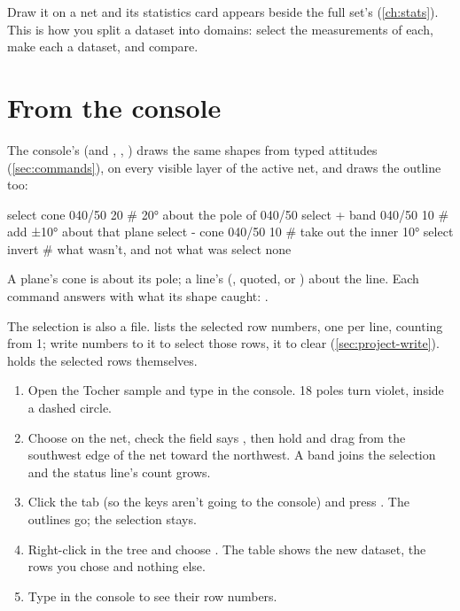 Draw it on a net and its statistics card appears beside the full set's (\cref{ch:stats}). This is how you
split a dataset into domains: select the measurements of each, make each a dataset, and compare.

\section{From the console}\label{sec:select-console}

The console's  (and , ,
) draws the same shapes from typed attitudes (\cref{sec:commands}), on every
visible layer of the active net, and draws the outline too:

\begin{codeblock}
select cone 040/50 20     # 20° about the pole of 040/50
select + band 040/50 10   # add ±10° about that plane
select - cone 040/50 10   # take out the inner 10°
select invert             # what wasn't, and not what was
select none
\end{codeblock}

A plane's cone is about its pole; a line's (, quoted, or ) about the line.
Each command answers with what its shape caught: .

The selection is also a file.  lists the selected row numbers, one per line,
counting from 1; write numbers to it to select those rows,  it to clear
(\cref{sec:project-write}).  holds the selected rows themselves.

\begin{tryit}
\begin{enumerate}
\item Open the Tocher sample and type  in the console. 18 poles turn violet,
inside a dashed circle.
\item Choose  on the net, check the field says , then hold  and drag from
the southwest edge of the net toward the northwest. A band joins the selection and the status line's
count grows.
\item Click the  tab (so the keys aren't going to the console) and press . The
outlines go; the selection stays.
\item Right-click  in the tree and choose . The table shows the new
dataset, the rows you chose and nothing else.
\item Type  in the console to see their row numbers.
\end{enumerate}
\end{tryit}

